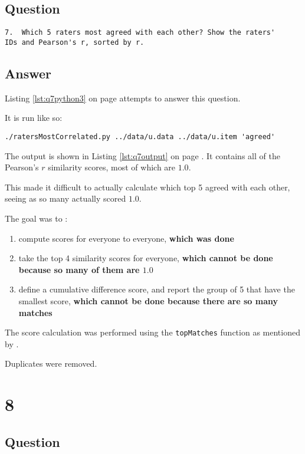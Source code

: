 \documentclass[letterpaper,11pt]{article}
\begin{document}
\subsection*{Question}

\begin{verbatim}
7.  Which 5 raters most agreed with each other? Show the raters'
IDs and Pearson's r, sorted by r.
\end{verbatim}

\subsection*{Answer}

Listing \ref{lst:q7python3} on page \pageref{lst:q7python3} attempts to answer this question.

It is run like so:
\begin{lstlisting}[frame=single]
./ratersMostCorrelated.py ../data/u.data ../data/u.item 'agreed'
\end{lstlisting}

The output is shown in Listing \ref{lst:q7output} on page \pageref{lst:q7output}.  It contains all of the Pearson's $r$ similarity scores, most of which are $1.0$.

This made it difficult to actually calculate which top 5 agreed with each other, seeing as so many actually scored $1.0$.

The goal was to \cite{nelsonmail}:
\begin{enumerate}
\item compute scores for everyone to everyone, \textbf{which was done}
\item take the top 4 similarity scores for everyone, \textbf{which cannot be done because so many of them are $1.0$}
\item define a cumulative difference score, and report the group of 5 that have the smallest score, \textbf{which cannot be done because there are so many matches}
\end{enumerate}

The score calculation was performed using the \verb+topMatches+ function as mentioned by \cite{adfm}.

Duplicates were removed.

\newpage

\section*{8}

\subsection*{Question}
\end{document}
